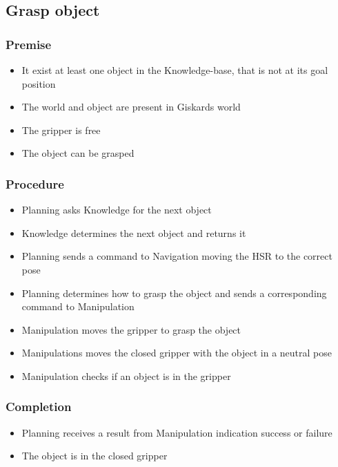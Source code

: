 \documentclass[main.tex]{subfiles}
\begin{document}
	\subsection{Grasp object}
	
	\subsubsection{Premise}
	\begin{itemize}
		\item It exist at least one object in the Knowledge-base, that is not at its goal position
		\item The world and object are present in Giskards world
		\item The gripper is free
		\item The object can be grasped 
	\end{itemize} 
	
	\subsubsection{Procedure}
	\begin{itemize}			
		\item Planning asks Knowledge for the next object
		\item Knowledge determines the next object and returns it
		\item Planning sends a command to Navigation moving the HSR to the correct pose
		\item Planning determines how to grasp the object and sends a corresponding command to Manipulation
		\item Manipulation moves the gripper to grasp the object
		\item Manipulations moves the closed gripper with the object in a neutral pose
		\item Manipulation checks if an object is in the gripper 				
	\end{itemize}
	
	\subsubsection{Completion}
	\begin{itemize}
		\item Planning receives a result from Manipulation indication success or failure
		\item The object is in the closed gripper	
	\end{itemize}
	
\end{document}
